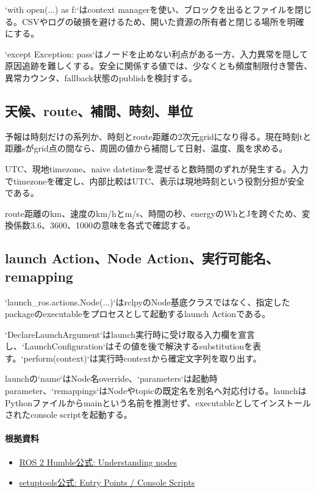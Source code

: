 \documentclass[a4paper,11pt]{article}
\begin{document}
`with open(...) as f:`はcontext managerを使い、ブロックを出るとファイルを閉じる。CSVやログの破損を避けるため、開いた資源の所有者と閉じる場所を明確にする。


`except Exception: pass`はノードを止めない利点がある一方、入力異常を隠して原因追跡を難しくする。安全に関係する値では、少なくとも頻度制限付き警告、異常カウンタ、fallback状態のpublishを検討する。



\subsection{天候、route、補間、時刻、単位}
予報は時刻だけの系列か、時刻とroute距離の2次元gridになり得る。現在時刻tと距離sがgrid点の間なら、周囲の値から補間して日射、温度、風を求める。


UTC、現地timezone、naive datetimeを混ぜると数時間のずれが発生する。入力でtimezoneを確定し、内部比較はUTC、表示は現地時刻という役割分担が安全である。


route距離のkm、速度のkm/hとm/s、時間の秒、energyのWhとJを跨ぐため、変換係数3.6、3600、1000の意味を各式で確認する。



\subsection{launch Action、Node Action、実行可能名、remapping}
`launch\_ros.actions.Node(...)`はrclpyのNode基底クラスではなく、指定したpackageのexecutableをプロセスとして起動するlaunch Actionである。


`DeclareLaunchArgument`はlaunch実行時に受け取る入力欄を宣言し、`LaunchConfiguration`はその値を後で解決するsubstitutionを表す。`perform(context)`は実行時contextから確定文字列を取り出す。


launchの`name`はNode名override、`parameters`は起動時parameter、`remappings`はNodeやtopicの既定名を別名へ対応付ける。launchはPythonファイルからmainという名前を推測せず、executableとしてインストールされたconsole scriptを起動する。

\paragraph{根拠資料}
\begin{itemize}[leftmargin=1.6em]
\item \href{https://docs.ros.org/en/humble/Tutorials/Beginner-CLI-Tools/Understanding-ROS2-Nodes/Understanding-ROS2-Nodes.html}{ROS 2 Humble公式: Understanding nodes}
\item \href{https://setuptools.pypa.io/en/latest/userguide/entry_point.html}{setuptools公式: Entry Points / Console Scripts}
\end{itemize}
\end{document}
